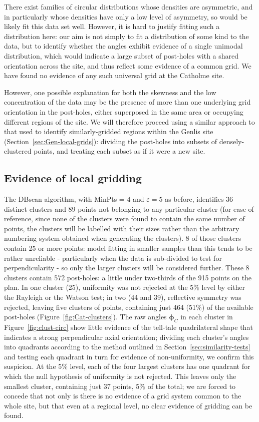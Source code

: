 \documentclass[../../ArchStats.tex]{subfiles}
\begin{document}
There exist families of circular distributions whose densities are asymmetric, and in particularly whose densities have only a low level of asymmetry\cite[4.3.11]{Pewsey2014}, so would be likely fit this data set well. However, it is hard to justify fitting such a distribution here: our aim is not simply to fit a distribution of some kind to the data, but to identify whether the angles exhibit evidence of a single unimodal distribution, which would indicate a large subset of post-holes with a shared orientation across the site, and thus reflect some evidence of a common grid. We have found no evidence of any such universal grid at the Catholme site. 

However, one possible explanation for both the skewness and the low concentration of the data may be the presence of more than one underlying grid orientation in the post-holes, either superposed in the same area or occupying different regions of the site. We will therefore proceed using a similar approach to that used to identify similarly-gridded regions within the Genlis site (Section~\ref{sec:Gen-local-grids}): dividing the post-holes into subsets of densely-clustered points, and treating each subset as if it were a new site.


\subsection{Evidence of local gridding}
The DBscan algorithm, with MinPts = 4 and $\varepsilon = 5$ as before, identifies 36 distinct clusters and 89 points not belonging to any particular cluster (for ease of reference, since none of the clusters were found to contain the same number of points, the clusters will be labelled with their sizes rather than the arbitrary numbering system obtained when generating the clusters). 8 of those clusters contain 25 or more points: model fitting in smaller samples than this tends to be rather unreliable - particularly when the data is sub-divided to test for perpendicularity - so only the larger clusters will be considered further. These 8 clusters contain 572 post-holes: a little under two-thirds of the 915 points on the plan. In one cluster (25), uniformity was not rejected at the 5\% level by either the Rayleigh or the Watson test; in two (44 and 39), reflective symmetry was rejected, leaving five clusters of points, containing just 464 (51\%) of the available post-holes (Figure~\ref{fig:Cat-clusters}). The raw angles $\boldsymbol{\phi}_C$ in each cluster in Figure~\ref{fig:clust-circ} show little evidence of the tell-tale quadrilateral shape that indicates a strong perpendicular axial orientation; dividing each cluster's angles into quadrants according to the method outlined in Section~\ref{sec:similarity-tests} and testing each quadrant in turn for evidence of non-uniformity, we confirm this suspicion. At the 5\% level, each  of the four largest clusters has one quadrant for which the null hypothesis of uniformity is not rejected. This leaves only the smallest cluster, containing just 37 points, 5\% of the total; we are forced to concede that not only is there is no evidence of a grid system common to the whole site, but that even at a regional level, no clear evidence of gridding can be found. %
\end{document}
